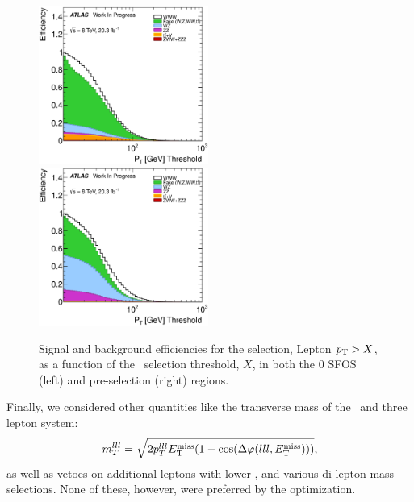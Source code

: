 \begin{figure}[ht!]
\centering
\includegraphics[width=0.495\textwidth]{figures/optimization/SignalRegionsPreselection_0SFOS_Efficiencies/AllLeptonPt_Cumulative.eps}
\includegraphics[width=0.495\textwidth]{figures/optimization/SignalRegions_0p5mmZ0_Preselection_Efficiencies/AllLeptonPt_Cumulative.eps}
\caption{ Signal and background efficiencies 
for the selection,
Lepton $p_{\mathrm{T}} > X$,
as a function of the \pt~selection
threshold, $X$, in both the 0 SFOS (left) and pre-selection (right) regions.  }
\label{fig:pt_eff}
\end{figure}

Finally, we considered other quantities like the 
transverse mass of the \MET~and three lepton system:
\begin{equation}
m_{T}^{lll} = \sqrt{2p_{T}^{lll}E_{\mathrm{T}}^{\mathrm{miss}}(1-\cos(\Delta\varphi(lll,E_{\mathrm{T}}^{\mathrm{miss}})))},
\end{equation}
as well as vetoes on additional leptons with lower \pt, and various
di-lepton mass selections.  None of these, however, were preferred
by the optimization.

